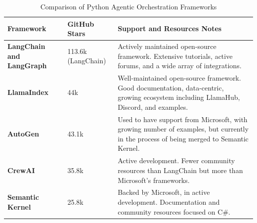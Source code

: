 \documentclass[a4paper]{report}
\begin{document}
\begin{table}[h]
\centering
\begin{tabular}{|p{3cm}|p{2.5cm}|p{8.2cm}|}
    \hline
    \textbf{Framework} & \textbf{GitHub Stars} & \textbf{Support and Resources Notes} \\ \hline
    \textbf{LangChain and \newline LangGraph} & 113.6k \newline (LangChain) & Actively maintained open-source framework. Extensive tutorials, active forums, and a wide array of integrations. \\ \hline
    \textbf{LlamaIndex} & 44k & Well-maintained open-source framework. Good documentation, data-centric, growing ecosystem including LlamaHub, Discord, and examples. \\ \hline
    \textbf{AutoGen} & 43.1k & Used to have support from Microsoft, with growing number of examples, but currently in the process of being merged to Semantic Kernel. \\ \hline
    \textbf{CrewAI} & 35.8k & Active development. Fewer community resources than LangChain but more than Microsoft's frameworks. \\ \hline
    \textbf{Semantic Kernel} & 25.8k & Backed by Microsoft, in active development. Documentation and community resources focused on C\#. \\ \hline
\end{tabular}
\caption{Comparison of Python Agentic Orchestration Frameworks}
\label{tab:orchestration_frameworks_stars}
\end{table}
\end{document}
